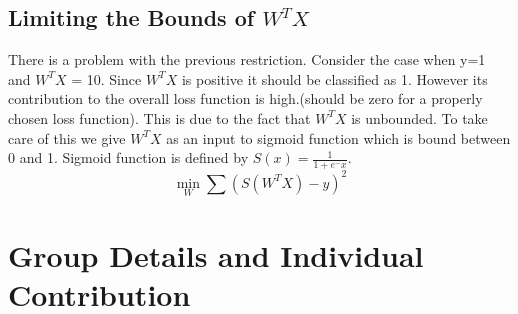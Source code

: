 \documentclass[11pt, twosides]{article}
\begin{document}
\subsection{Limiting the Bounds of $W^TX$}
There is a problem with the previous restriction. Consider the case when y=1 and $W^TX$ = 10. Since $W^TX$ is positive it should be classified as 1. However its contribution to the overall loss function is high.(should be zero for a properly chosen loss function). This is due to the fact that $W^TX$ is unbounded. To take care of this we give $W^TX$ as an input to sigmoid function which is bound between 0 and 1. Sigmoid function is defined by $S(x) = \frac{1}{1 + e^-x}$.
\begin{equation}
    \min_{W} \sum{\left(S(W^TX)- y\right)^2}
\end{equation}





\section{Group Details and Individual Contribution}
\end{document}
